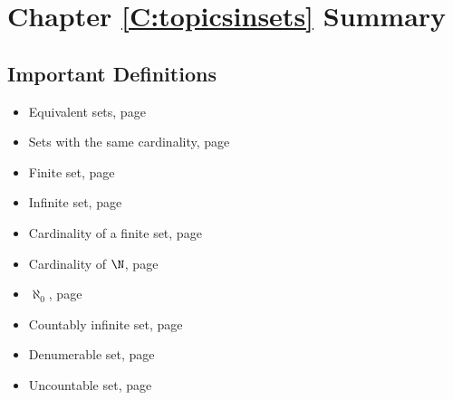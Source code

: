 \newpage
\section{Chapter \ref{C:topicsinsets} Summary} \label{Su:topicsinsets}

\subsection*{Important Definitions}
\begin{multicols}{2}
\begin{itemize}
\item Equivalent sets, page~\pageref*{equivsets}
\item Sets with the same cardinality, page~\pageref*{equivsets}
\item Finite set, page~\pageref*{cardinalityfinite}
\item Infinite set, page~\pageref*{cardinalityfinite}
\item Cardinality of a finite set, page~\pageref*{cardinalityfinite}
\item Cardinality of $\N$, page~\pageref*{aleph0}
\item $\aleph_0$, page~\pageref*{aleph0}
\item Countably infinite set, page~\pageref*{countinfinite}
\item Denumerable set, page~\pageref*{countinfinite}
\item Uncountable set, page~\pageref*{countinfinite}
\end{itemize}
\end{multicols}
\hbreak



